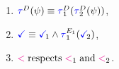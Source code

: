 \begin{figure}
\begin{multicols}{2}
\begin{enumerate}[topsep=0pt,label=(\textsc{s}\arabic*),ref=\textsc{s}\arabic*]
    \item \label{seq-tau}
      $\aTr{\bEvs}{\bForm} \riff \aTr[1]{\bEvs}{\aTr[2]{\bEvs}{\bForm}}$,
    \item \label{seq-term}
      $\aTerm \riff \aTerm[1]\land\aTrAbbrv[1]{\aEvs_1}{\aTerm[2]}$,
    \item \label{seq-le}
      ${\lt}\rextends{\lt_1}{\lt_2}$.
    \end{enumerate}
  \end{multicols}
  \medskip


\end{figure}
